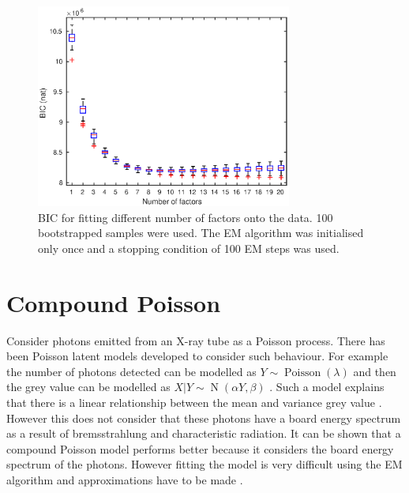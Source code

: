 \documentclass[12pt]{report}
\DeclareMathOperator{\normal}{N}
\DeclareMathOperator{\poisson}{Poisson}
\begin{document}
\begin{figure}
	\centering
	\includegraphics[width=0.75\textwidth]{figures/initial_factor_BIC_bootstrap.eps}
	\caption{BIC for fitting different number of factors onto the data. 100 bootstrapped samples were used. The EM algorithm was initialised only once and a stopping condition of 100 EM steps was used.}
	\label{fig:initial_factor_BIC_bootstrap}
\end{figure}

\section{Compound Poisson}
Consider photons emitted from an X-ray tube as a Poisson process. There has been Poisson latent models developed to consider such behaviour. For example the number of photons detected can be modelled as $Y\sim\poisson(\lambda)$ and then the grey value can be modelled as $X|Y\sim\normal(\alpha Y,\beta)$ \cite{jin2014investigating}. Such a model explains that there is a linear relationship between the mean and variance grey value \cite{jin2014investigating}. However this does not consider that these photons have a board energy spectrum as a result of bremsstrahlung and characteristic radiation. It can be shown that a compound Poisson model performs better \cite{whiting2006properties} because it considers the board energy spectrum of the photons. However fitting the model is very difficult using the EM algorithm and approximations have to be made \cite{xie2008x}.
\end{document}
